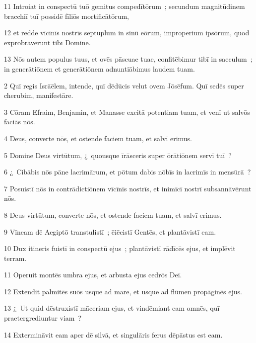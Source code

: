 \psalmVerse
  {\phantom{0}11}
  {Introiat in conspectū tuō gemitus compedītōrum~; secundum magnitūdinem bracchiī tuī possidē fīliōs mortificātōrum,}


\psalmVerse
  {\phantom{0}12}
  {et redde vīcīnīs nostrīs septuplum in sinū eōrum, improperium ipsōrum, quod exprobrāvērunt tibī Domine.}


\psalmVerse
  {\phantom{0}13}
  {Nōs autem populus tuus, et ovēs pāscuae tuae, confitēbimur tibī in saeculum~; in generātiōnem et generātiōnem adnuntiābimus laudem tuam.}



\psalmVerse
  {\phantom{00}2}
  {Quī regis Isrāēlem, intende, quī dēdūcis velut ovem Jōsēfum. Quī sedēs super cherubim, manifestāre.}


\psalmVerse
  {\phantom{00}3}
  {Cōram Efraim, Benjamin, et Manasse excitā potentiam tuam, et venī ut salvōs faciās nōs.}


\psalmVerse
  {\phantom{00}4}
  {Deus, converte nōs, et ostende faciem tuam, et salvī erimus.}


\psalmVerse
  {\phantom{00}5}
  {Domine Deus virtūtum, ¿~quousque īrāsceris super ōrātiōnem servī tuī~?}


\psalmVerse
  {\phantom{00}6}
  {¿~Cibābis nōs pāne lacrimārum, et pōtum dabis nōbīs in lacrimīs in mensūrā~?}


\psalmVerse
  {\phantom{00}7}
  {Posuistī nōs in contrādictiōnem vīcīnīs nostrīs, et inimīcī nostrī subsannāvērunt nōs.}


\psalmVerse
  {\phantom{00}8}
  {Deus virtūtum, converte nōs, et ostende faciem tuam, et salvī erimus.}


\psalmVerse
  {\phantom{00}9}
  {Vīneam dē Aegiptō transtulistī~; ēiēcistī Gentēs, et plantāvistī eam.}


\psalmVerse
  {\phantom{0}10}
  {Dux itineris fuistī in conspectū ejus~; plantāvistī rādīcēs ejus, et implēvit terram.}


\psalmVerse
  {\phantom{0}11}
  {Operuit montēs umbra ejus, et arbusta ejus cedrōs Deī.}


\psalmVerse
  {\phantom{0}12}
  {Extendit palmitēs suōs usque ad mare, et usque ad flūmen propāginēs ejus.}


\psalmVerse
  {\phantom{0}13}
  {¿~Ut quid dēstruxistī māceriam ejus, et vindēmiant eam omnēs, quī praetergrediuntur viam~?}


\psalmVerse
  {\phantom{0}14}
  {Extermināvit eam aper dē silvā, et singulāris ferus dēpāstus est eam.}


